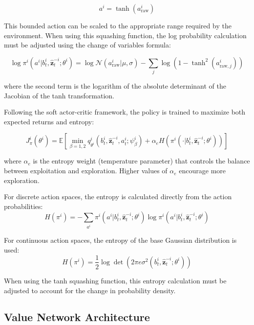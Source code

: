 \begin{equation}
    a^i = \tanh(a^i_{\text{raw}})
\end{equation}

This bounded action can be scaled to the appropriate range required by the environment. When using this squashing function, the log probability calculation must be adjusted using the change of variables formula:

\begin{equation}
    \log \pi^i(a^i|b^i_t, \hat{\boldsymbol{z}}^{-i}_t; \theta^i) = \log \mathcal{N}(a^i_{\text{raw}}|\mu, \sigma) - \sum_{j} \log(1 - \tanh^2(a^i_{\text{raw},j}))
\end{equation}

where the second term is the logarithm of the absolute determinant of the Jacobian of the tanh transformation.

Following the soft actor-critic framework, the policy is trained to maximize both expected returns and entropy:

\begin{equation}
    J^{i}_{\pi}(\theta^{i}) = \mathbb{E}[\min_{\beta=1,2}q^{i}_{\theta^i}(b^{i}_{t}, \hat{\boldsymbol{z}}^{-i}_{t}, a^{i}_{t}; \psi^{i}_{\beta}) + \alpha_e H(\pi^{i}(\cdot|b^{i}_{t}, \hat{\boldsymbol{z}}^{-i}_{t}; \theta^{i}))]
\end{equation}

where $\alpha_e$ is the entropy weight (temperature parameter) that controls the balance between exploitation and exploration. Higher values of $\alpha_e$ encourage more exploration.

For discrete action spaces, the entropy is calculated directly from the action probabilities:
\begin{equation}
    H(\pi^{i}) = -\sum_{a^i} \pi^i(a^i|b^i_t, \hat{\boldsymbol{z}}^{-i}_t; \theta^i) \log \pi^i(a^i|b^i_t, \hat{\boldsymbol{z}}^{-i}_t; \theta^i)
\end{equation}

For continuous action spaces, the entropy of the base Gaussian distribution is used:
\begin{equation}
    H(\pi^{i}) = \frac{1}{2}\log\det(2\pi e \sigma^2(b^i_t, \hat{\boldsymbol{z}}^{-i}_t; \theta^i))
\end{equation}

When using the tanh squashing function, this entropy calculation must be adjusted to account for the change in probability density.

\subsection{Value Network Architecture}

